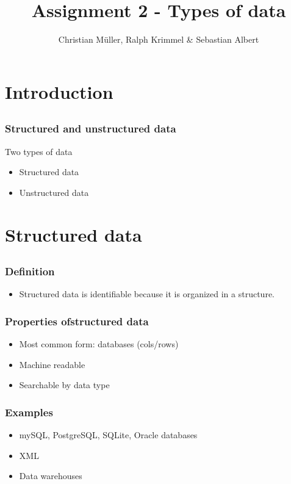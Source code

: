 \documentclass{beamer}
\title{Assignment 2 - Types of data}
\author{Christian Müller, Ralph Krimmel \& Sebastian Albert}
\begin{document}
\section{Introduction}
\subsection*{}
\begin{frame}
	\maketitle
\end{frame}

\begin{frame}
	\frametitle{Structured and unstructured data}
	\begin{block}{Two types of data}
	\begin{itemize}
		\item Structured data
		\item Unstructured data
	\end{itemize}
	\end{block}
\end{frame}

\section{Structured data}
\subsection*{}
\begin{frame}
	\frametitle{Definition}
	\begin{itemize}
		\item Structured data is identifiable because it is organized in a structure.
	\end{itemize}
\end{frame}

\begin{frame}
	\frametitle{Properties ofstructured data}
	\begin{itemize}
		\item Most common form: databases (cols/rows)
		\item Machine readable 
		\item Searchable by data type
	\end{itemize}
\end{frame}

\begin{frame}
	\frametitle{Examples}
	\begin{itemize}
		\item mySQL, PostgreSQL, SQLite, Oracle databases
		\item XML
		\item Data warehouses
	\end{itemize}
\end{frame}
\end{document}
